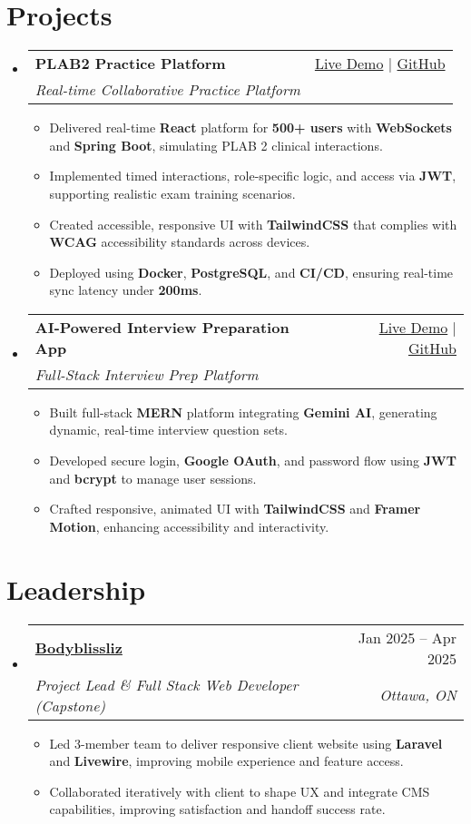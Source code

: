 \documentclass[letterpaper,10pt]{article}
\makeatletter
\newcommand{\resumeItem}[1]{\item\small{#1 \vspace{-2pt}}}
\newcommand{\resumeSubheading}[4]{
  \vspace{-1pt}\item
    \begin{tabular*}{0.97\textwidth}[t]{l@{\extracolsep{\fill}}r}
      \textbf{#1} & #2 \\
      \textit{\small#3} & \textit{\small #4} \\
    \end{tabular*}\vspace{-5pt}
}
\newcommand{\resumeSubHeadingListStart}{\begin{itemize}[leftmargin=*]}
\newcommand{\resumeSubHeadingListEnd}{\end{itemize}}
\newcommand{\resumeItemListStart}{\begin{itemize}}
\newcommand{\resumeItemListEnd}{\end{itemize}\vspace{-5pt}}
\makeatother
\begin{document}
\section{Projects}
  \resumeSubHeadingListStart
    \resumeSubheading
      {\textbf{PLAB2 Practice Platform}}{\href{https://plab2practice.com}{Live Demo} | \href{https://github.com/altansaid/plab2projectnew}{GitHub}}
      {Real-time Collaborative Practice Platform}{}
      \resumeItemListStart
        \resumeItem{Delivered real-time \textbf{React} platform for \textbf{500+ users} with \textbf{WebSockets} and \textbf{Spring Boot}, simulating PLAB 2 clinical interactions.}
        \resumeItem{Implemented timed interactions, role-specific logic, and access via \textbf{JWT}, supporting realistic exam training scenarios.}
        \resumeItem{Created accessible, responsive UI with \textbf{TailwindCSS} that complies with \textbf{WCAG} accessibility standards across devices.}
        \resumeItem{Deployed using \textbf{Docker}, \textbf{PostgreSQL}, and \textbf{CI/CD}, ensuring real-time sync latency under \textbf{200ms}.}
      \resumeItemListEnd

    \resumeSubheading
      {\textbf{AI-Powered Interview Preparation App}}{\href{https://interviewcoach-ai.vercel.app}{Live Demo} | \href{https://github.com/altansaid/interviewcoach-ai}{GitHub}}
      {Full-Stack Interview Prep Platform}{}
      \resumeItemListStart
        \resumeItem{Built full-stack \textbf{MERN} platform integrating \textbf{Gemini AI}, generating dynamic, real-time interview question sets.}
        \resumeItem{Developed secure login, \textbf{Google OAuth}, and password flow using \textbf{JWT} and \textbf{bcrypt} to manage user sessions.}
        \resumeItem{Crafted responsive, animated UI with \textbf{TailwindCSS} and \textbf{Framer Motion}, enhancing accessibility and interactivity.}
      \resumeItemListEnd
  \resumeSubHeadingListEnd

\section{Leadership}
  \resumeSubHeadingListStart
    \resumeSubheading
      {\href{https://www.bodyblissliz.com}{Bodyblissliz}}{Jan 2025 -- Apr 2025}
      {Project Lead \& Full Stack Web Developer (Capstone)}{Ottawa, ON}
      \resumeItemListStart
        \resumeItem{Led 3-member team to deliver responsive client website using \textbf{Laravel} and \textbf{Livewire}, improving mobile experience and feature access.}
        \resumeItem{Collaborated iteratively with client to shape UX and integrate CMS capabilities, improving satisfaction and handoff success rate.}
      \resumeItemListEnd
  \resumeSubHeadingListEnd
\end{document}
